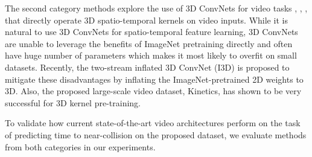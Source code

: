 The second category methods explore the use of 3D ConvNets for video tasks \cite{C3D}, \cite{videoResNet}, \cite{p3d}, \cite{two-stream} that directly operate 3D spatio-temporal kernels on video inputs. While it is natural to use 3D ConvNets for spatio-temporal feature learning, 3D ConvNets are unable to leverage the benefits of ImageNet pretraining directly and often have huge number of parameters which makes it most likely to overfit on small datasets. Recently, the two-stream inflated 3D ConvNet (I3D) \cite{i3d} is proposed to mitigate these disadvantages by inflating the ImageNet-pretrained 2D weights to 3D. Also, the proposed large-scale video dataset, Kinetics, has shown to be very successful for 3D kernel pre-training.
 

To validate how current state-of-the-art video architectures perform on the task of predicting time to near-collision on the proposed dataset, we evaluate methods from both categories in our experiments.



